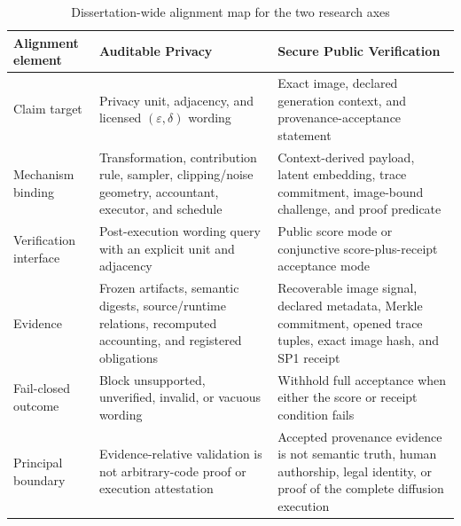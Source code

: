 \begin{table}[tbp]
    \centering
    \caption{Dissertation-wide alignment map for the two research axes}
    \label{tab:ch1-alignment-map}
    \footnotesize
    \setlength{\tabcolsep}{3.2pt}
    \renewcommand{\arraystretch}{1.14}
    \begin{tabular}{@{}
        >{\raggedright\arraybackslash}p{}
        >{\raggedright\arraybackslash}p{}
        >{\raggedright\arraybackslash}p{}@{}}
        \toprule
        \textbf{Alignment element} &
        \textbf{Auditable Privacy} &
        \textbf{Secure Public Verification} \\
        \midrule
        Claim target &
        Privacy unit, adjacency, and licensed
        \((\varepsilon,\delta)\) wording &
        Exact image, declared generation context, and provenance-acceptance
        statement \\

        Mechanism binding &
        Transformation, contribution rule, sampler, clipping/noise geometry,
        accountant, executor, and schedule &
        Context-derived payload, latent embedding, trace commitment, image-bound
        challenge, and proof predicate \\

        Verification interface &
        Post-execution wording query with an explicit unit and adjacency &
        Public score mode or conjunctive score-plus-receipt acceptance mode \\

        Evidence &
        Frozen artifacts, semantic digests, source/runtime relations, recomputed
        accounting, and registered obligations &
        Recoverable image signal, declared metadata, Merkle commitment, opened
        trace tuples, exact image hash, and SP1 receipt \\

        Fail-closed outcome &
        Block unsupported, unverified, invalid, or vacuous wording &
        Withhold full acceptance when either the score or receipt condition fails
        \\

        Principal boundary &
        Evidence-relative validation is not arbitrary-code proof or execution
        attestation &
        Accepted provenance evidence is not semantic truth, human authorship,
        legal identity, or proof of the complete diffusion execution \\
        \bottomrule
    \end{tabular}
\end{table}

